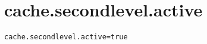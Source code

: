 \section{cache.secondlevel.active}
\label{configuration:CacheSecondlevelActive}
\ClearAPI
\TODO
{}
\begin{lstlisting}[style=Props,caption={Usage example for \textit{cache.secondlevel.active}}]
cache.secondlevel.active=true
\end{lstlisting}
